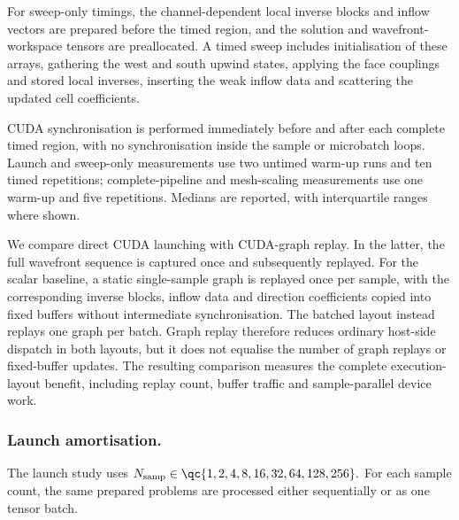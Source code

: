 \documentclass[final]{amsart}
\begin{document}
For sweep-only timings, the channel-dependent local inverse blocks and
inflow vectors are prepared before the timed region, and the solution
and wavefront-workspace tensors are preallocated. A timed sweep includes
initialisation of these arrays, gathering the west and south upwind
states, applying the face couplings and stored local inverses, inserting
the weak inflow data and scattering the updated cell coefficients.

CUDA synchronisation is performed immediately before and after each
complete timed region, with no synchronisation inside the sample or
microbatch loops. Launch and sweep-only measurements use two untimed
warm-up runs and ten timed repetitions; complete-pipeline and
mesh-scaling measurements use one warm-up and five repetitions.
Medians are reported, with interquartile ranges where shown.

We compare direct CUDA launching with CUDA-graph replay. In the latter,
the full wavefront sequence is captured once and subsequently replayed.
For the scalar baseline, a static single-sample graph is replayed once
per sample, with the corresponding inverse blocks, inflow data and
direction coefficients copied into fixed buffers without intermediate
synchronisation. The batched layout instead replays one graph per
batch. Graph replay therefore reduces ordinary host-side dispatch in
both layouts, but it does not equalise the number of graph replays or
fixed-buffer updates. The resulting comparison measures the complete
execution-layout benefit, including replay count, buffer traffic and
sample-parallel device work.

\subsubsection{Launch amortisation.}

The launch study uses $N_{\mathrm{samp}} \in
\qc{1,2,4,8,16,32,64,128,256}.$ For each sample count, the same
prepared problems are processed either sequentially or as one tensor
batch.
\end{document}
